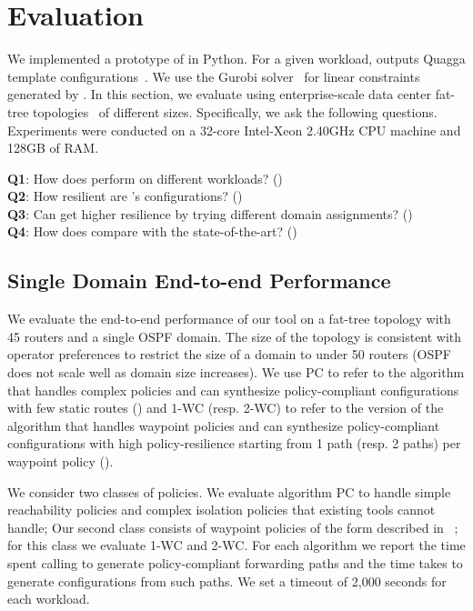 \section{Evaluation}
 \label{sec:evaluation}
 
 We implemented a prototype of \name in Python. 
 For a given workload, \name outputs Quagga template
 configurations~\cite{quagga}. 
 We use the Gurobi solver~\cite{gurobi} 
 for linear constraints generated by \name.
  In this section, we evaluate \Name using
enterprise-scale data
center fat-tree topologies~\cite{fattree} of different 
sizes. 
Specifically, we ask the following questions.
Experiments were conducted on a
32-core Intel-Xeon 2.40GHz CPU machine and
128GB of RAM.

\vspace{2mm}
\noindent\textbf{Q1}: How does \name perform on different  workloads? ()\\
\noindent\textbf{Q2}: How resilient are \name's  configurations? ()\\
\noindent\textbf{Q3}: Can \name get higher resilience by trying different domain assignments? ()\\
\noindent\textbf{Q4}: How does \name compare with the state-of-the-art? ()



\subsection{Single Domain End-to-end Performance}\label{sec:ospfeval}


We evaluate the end-to-end performance of our tool
on a  fat-tree 
topology with 45 routers
and a single OSPF domain. 
The size of the topology is consistent with operator preferences to restrict
the size of a domain to under 50 routers (OSPF does not scale
well as domain size increases).
We use PC to refer to the algorithm that handles complex policies and
can synthesize policy-compliant
configurations with few static routes ()
and 
1-WC (resp. 2-WC) to refer to the version of  the algorithm that handles waypoint policies and
can synthesize policy-compliant
configurations with high policy-resilience starting from 1 path (resp. 2 paths) per waypoint policy ().

We consider two classes of policies. 
We evaluate algorithm PC to handle simple
reachability policies and complex isolation policies that 
existing tools cannot handle; 
Our second class consists of
 waypoint policies of the form described in ~;
for this class we evaluate 1-WC and 2-WC.
For each algorithm we report the time spent 
calling \genesis to generate policy-compliant forwarding paths
and the time \name takes to generate configurations 
from such paths. 
We set a timeout of 2,000 seconds for each workload.

